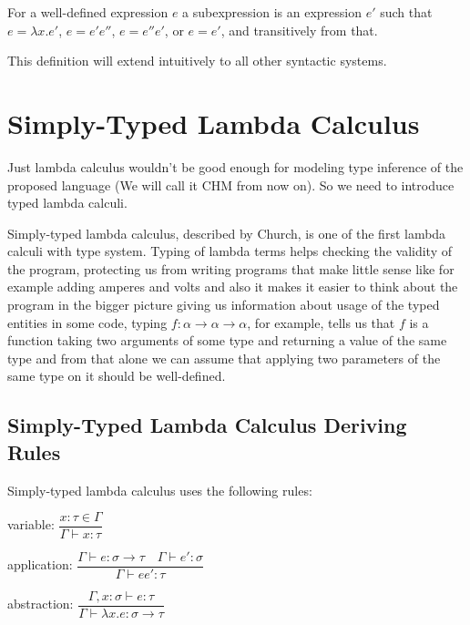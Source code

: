 For a well-defined expression $e$ a subexpression is an expression $e'$ such that $e = \lambda x . e'$, $e = e' e''$, $e = e'' e'$, or $e = e'$, and transitively from that.

This definition will extend intuitively to all other syntactic systems.

\section{Simply-Typed Lambda Calculus}

Just lambda calculus wouldn't be good enough for modeling type inference of the proposed language (We will call it CHM from now on).
So we need to introduce typed lambda calculi.

Simply-typed lambda calculus, described by Church, is one of the first %
lambda calculi with type system. Typing of lambda terms helps checking the validity of the program, protecting us from writing
programs that make little sense like for example adding amperes and volts %
and also it makes it easier to think about the program in the bigger picture giving us information about usage of the typed entities
in some code, typing $f : \alpha \rightarrow \alpha \rightarrow \alpha$, for example, tells us that $f$ is a function taking two arguments
of some type and returning a value of the same type and from that alone we can assume that applying two parameters of the same type on it
should be well-defined.


\subsection{Simply-Typed Lambda Calculus Deriving Rules}

Simply-typed lambda calculus uses the following rules:


variable:
$\dfrac{x : \tau \in \Gamma}{\Gamma \vdash x : \tau}$

application:
$\dfrac{\Gamma \vdash e : \sigma \rightarrow \tau \quad \Gamma \vdash e' : \sigma}{\Gamma \vdash e e' : \tau}$

abstraction:
$\dfrac{\Gamma, x : \sigma \vdash e : \tau}{\Gamma \vdash \lambda x . e : \sigma \rightarrow \tau}$


